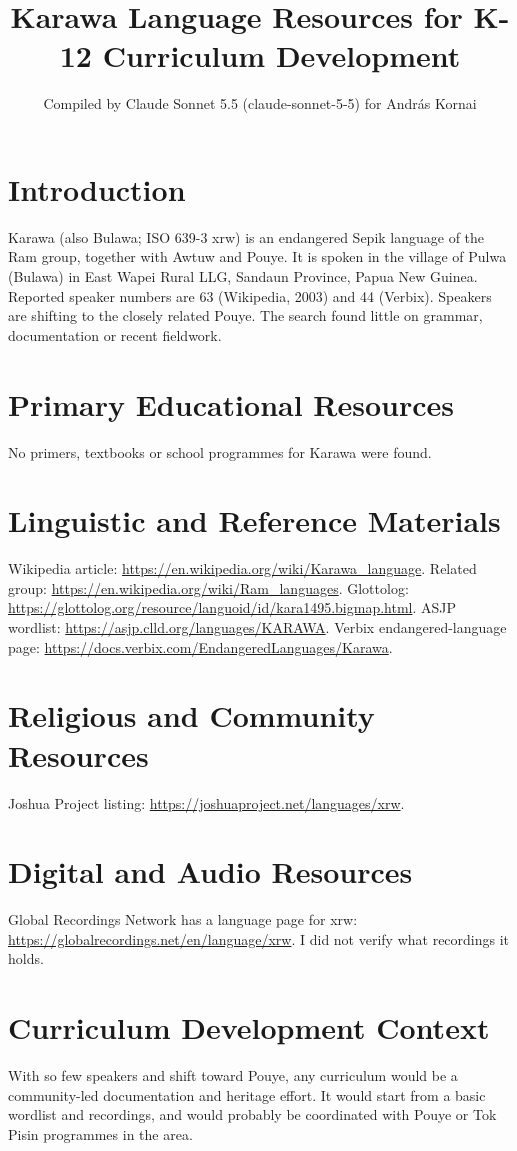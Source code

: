 \documentclass[12pt]{article}
\title{Karawa Language Resources for K-12 Curriculum Development}
\author{Compiled by Claude Sonnet 5.5 (claude-sonnet-5-5) for Andr\'as Kornai}
\date{}
\begin{document}
\maketitle

\section{Introduction}
Karawa (also Bulawa; ISO 639-3 xrw) is an endangered Sepik language of the Ram group, together with Awtuw and Pouye. It is spoken in the village of Pulwa (Bulawa) in East Wapei Rural LLG, Sandaun Province, Papua New Guinea. Reported speaker numbers are 63 (Wikipedia, 2003) and 44 (Verbix). Speakers are shifting to the closely related Pouye. The search found little on grammar, documentation or recent fieldwork.

\section{Primary Educational Resources}
No primers, textbooks or school programmes for Karawa were found.

\section{Linguistic and Reference Materials}
Wikipedia article: \url{https://en.wikipedia.org/wiki/Karawa_language}. Related group: \url{https://en.wikipedia.org/wiki/Ram_languages}. Glottolog: \url{https://glottolog.org/resource/languoid/id/kara1495.bigmap.html}. ASJP wordlist: \url{https://asjp.clld.org/languages/KARAWA}. Verbix endangered-language page: \url{https://docs.verbix.com/EndangeredLanguages/Karawa}.

\section{Religious and Community Resources}
Joshua Project listing: \url{https://joshuaproject.net/languages/xrw}.

\section{Digital and Audio Resources}
Global Recordings Network has a language page for xrw: \url{https://globalrecordings.net/en/language/xrw}. I did not verify what recordings it holds.

\section{Curriculum Development Context}
With so few speakers and shift toward Pouye, any curriculum would be a community-led documentation and heritage effort. It would start from a basic wordlist and recordings, and would probably be coordinated with Pouye or Tok Pisin programmes in the area.
\end{document}
